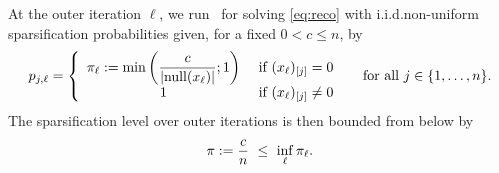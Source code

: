 At the outer iteration $\ell$, we run \spyI~for solving \eqref{eq:reco} with i.i.d.\;non-uniform sparsification probabilities given, for a fixed $0<c\leq n$, by
\begin{align}
\label{eq:pvec}
p_{j,\ell} = \left\{ \begin{array}{cr}
 \pi_\ell := \min\left(\displaystyle\frac{c}{|\mathrm{null}(x_\ell)|};1\right) & \text{ if } (x_\ell)_{[j]} = 0 \\
   1  &  \text{ if } (x_\ell)_{[j]} \neq  0 
\end{array}   \right. ~~~~ \text{for all $j\in\{1,\dots,n\}$}.
\end{align}
The sparsification level over outer iterations is then bounded from below by
\begin{align*}
     \pi := \frac{c}{n} ~\leq~ \inf_\ell \pi_\ell.
\end{align*}


